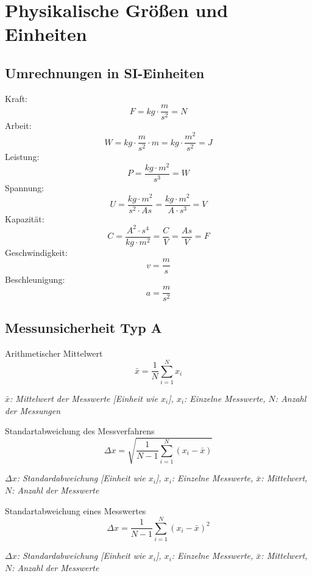 \documentclass[a4paper,10pt]{article}
\newenvironment{displayformula}
{
	\begin{framed}
		\color{formulaColor}
	}
	{\end{framed}}
\newcommand{\formulalegend}[1]{%
	\par\vspace{0.5ex}%
	{{\color{legendColor}\RaggedRight\small\textit{#1}}}%
	\par\vspace{1.5ex}%
}
\begin{document}
	\tableofcontents
	
	
	\section{Physikalische Größen und Einheiten}
	
	\subsection{Umrechnungen in SI-Einheiten}
	

		\begin{displayformula}
			Kraft:
		\[
		F = kg \cdot \frac{m}{s^2} = N
		\]
		Arbeit:
		\[
		W = kg \cdot \frac{m}{s^2} \cdot m = kg \cdot \frac{m^2}{s^2} = J
		\]
		Leistung:
		\[
		P = \frac{kg \cdot m^2}{s^3} = W
		\]
		Spannung:
		\[
		U = \frac{kg \cdot m^2}{s^2 \cdot As} = \frac{kg \cdot m^2}{A \cdot s^3} = V
		\]
		Kapazität:
		\[
		C = \frac{A^2 \cdot s^4}{kg \cdot m^2} = \frac{C}{V} = \frac{As}{V} = F
		\]
		Geschwindigkeit:
		\[
		v = \frac{m}{s}
		\]
		Beschleunigung:
		\[
		a = \frac{m}{s^2}
		\]
		\end{displayformula}

	
	
	\subsection{Messunsicherheit Typ A}
	
	\begin{displayformula}
		Arithmetischer Mittelwert
		\[
		\bar{x} = \frac{1}{N} \sum_{i=1}^{N} x_i
		\]
	\end{displayformula}
	\formulalegend{
		\( \bar{x} \): Mittelwert der Messwerte [Einheit wie \( x_i \)], \( x_i \): Einzelne Messwerte, \( N \): Anzahl der Messungen
	}
	
	\begin{displayformula}
		Standartabweichung des Messverfahrens
		\[
		\Delta x = \sqrt{\frac{1}{N - 1} \sum_{i = 1}^{N} (x_i - \bar{x})}
		\]
	\end{displayformula}
		\formulalegend{
		\( \Delta x \): Standardabweichung [Einheit wie \( x_i \)], \( x_i \): Einzelne Messwerte, \( \bar{x} \): Mittelwert, \( N \): Anzahl der Messwerte
	}
	
	\begin{displayformula}
		Standartabweichung eines Messwertes
		\[
		\Delta x = \frac{1}{N - 1} \sum_{i = 1}^{N} (x_i - \bar{x})^2
		\]	
	\end{displayformula}
	\formulalegend{
		\( \Delta x \): Standardabweichung [Einheit wie \( x_i \)], \( x_i \): Einzelne Messwerte, \( \bar{x} \): Mittelwert, \( N \): Anzahl der Messwerte
	}
	
\end{document}
